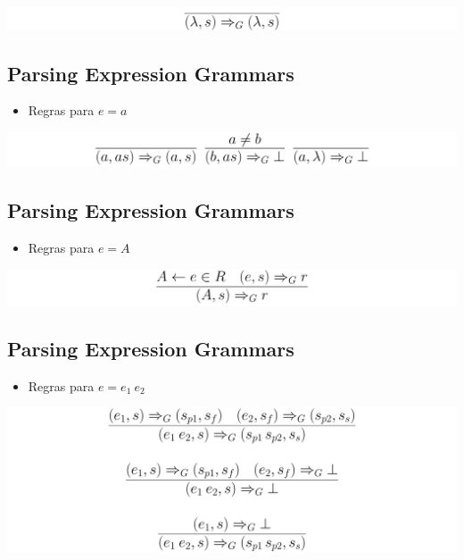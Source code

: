 \documentclass[11pt]{article}
\begin{document}
\begin{center}
\includegraphics[width=.9\linewidth]{./imgs/image1.png}
\end{center}
\subsection*{Parsing Expression Grammars}
\label{sec:org1e54092}

\begin{itemize}
\item Regras para \(e = a\)
\end{itemize}


\begin{center}
\includegraphics[width=.9\linewidth]{./imgs/image2.png}
\end{center}
\subsection*{Parsing Expression Grammars}
\label{sec:orgcf90cf5}

\begin{itemize}
\item Regras para \(e = A\)
\end{itemize}


\begin{center}
\includegraphics[width=.9\linewidth]{./imgs/image3.png}
\end{center}
\subsection*{Parsing Expression Grammars}
\label{sec:orgb7a1746}

\begin{itemize}
\item Regras para \(e = e_1\:e_2\)
\end{itemize}


\begin{center}
\includegraphics[width=.9\linewidth]{./imgs/image4.png}
\end{center}
\end{document}
